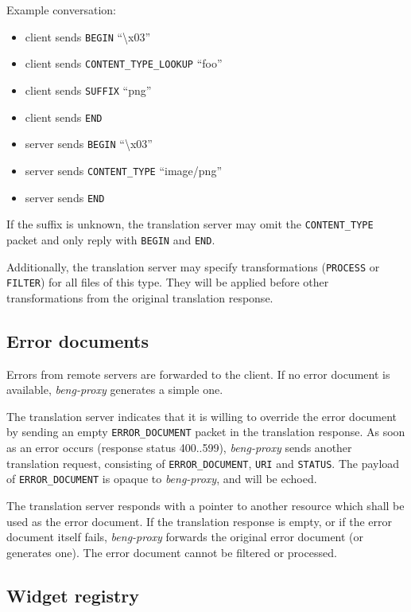 \documentclass[a4paper,12pt]{article}
\begin{document}
Example conversation:

\begin{itemize}
\item client sends \verb|BEGIN| ``\textbackslash{}x03''
\item client sends \verb|CONTENT_TYPE_LOOKUP| ``foo''
\item client sends \verb|SUFFIX| ``png''
\item client sends \verb|END|
\item server sends \verb|BEGIN| ``\textbackslash{}x03''
\item server sends \verb|CONTENT_TYPE| ``image/png''
\item server sends \verb|END|
\end{itemize}

If the suffix is unknown, the translation server may omit the
\verb|CONTENT_TYPE| packet and only reply with \verb|BEGIN| and
\verb|END|.

Additionally, the translation server may specify transformations
(\verb|PROCESS| or \verb|FILTER|) for all files of this type.  They
will be applied before other transformations from the original
translation response.

\subsection{Error documents}
\label{errdoc}

Errors from remote servers are forwarded to the client.  If no error
document is available, \emph{beng-proxy} generates a simple one.

The translation server indicates that it is willing to override the
error document by sending an empty \verb|ERROR_DOCUMENT| packet in
the translation response.  As soon as an error occurs (response status
400..599), \emph{beng-proxy} sends another translation request,
consisting of \verb|ERROR_DOCUMENT|, \verb|URI| and
\verb|STATUS|.  The payload of \verb|ERROR_DOCUMENT| is opaque to
\emph{beng-proxy}, and will be echoed.

The translation server responds with a pointer to another resource
which shall be used as the error document.  If the translation
response is empty, or if the error document itself fails,
\emph{beng-proxy} forwards the original error document (or generates
one).  The error document cannot be filtered or processed.

\subsection{Widget registry}
\label{registry}
\end{document}
